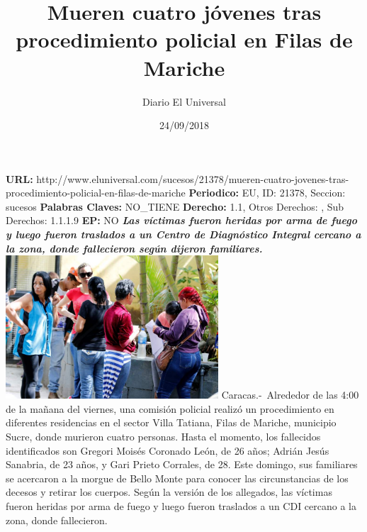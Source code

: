 \documentclass{article}%
\title{\textbf{Mueren cuatro jóvenes tras procedimiento policial en Filas de Mariche}}%
\author{Diario El Universal}%
\date{24/09/2018}%
\begin{document}
%
\normalsize%
\maketitle%
\textbf{URL: }%
http://www.eluniversal.com/sucesos/21378/mueren{-}cuatro{-}jovenes{-}tras{-}procedimiento{-}policial{-}en{-}filas{-}de{-}mariche\newline%
%
\textbf{Periodico: }%
EU, %
ID: %
21378, %
Seccion: %
sucesos\newline%
%
\textbf{Palabras Claves: }%
NO\_TIENE\newline%
%
\textbf{Derecho: }%
1.1, %
Otros Derechos: %
, %
Sub Derechos: %
1.1.1.9\newline%
%
\textbf{EP: }%
NO\newline%
\newline%
%
\textbf{\textit{Las víctimas fueron heridas por arma de fuego y luego fueron traslados a un Centro de Diagnóstico Integral cercano a la zona, donde fallecieron según dijeron familiares.}}%
\newline%
\newline%
%
\includegraphics[width=300px]{258.jpg}%
\newline%
%
Caracas.{-}~Alrededor de las 4:00 de la mañana del viernes, una comisión policial realizó un procedimiento en diferentes residencias en el sector Villa Tatiana, Filas de Mariche, municipio Sucre, donde murieron cuatro personas.%
\newline%
%
Hasta el momento, los fallecidos identificados son Gregori Moisés Coronado León, de 26 años; Adrián Jesús Sanabria, de 23 años, y Gari Prieto Corrales, de 28.%
\newline%
%
Este domingo, sus familiares se acercaron a la morgue de Bello Monte para conocer las circunstancias de los decesos y retirar los cuerpos.%
\newline%
%
Según la versión de los allegados, las víctimas fueron heridas por arma de fuego y luego fueron traslados a un CDI cercano a la zona, donde fallecieron.%
\newline%
\end{document}
